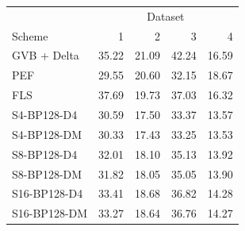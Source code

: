 \begin{tabular}{lrrrr}
\toprule
 & \multicolumn{4}{c}{Dataset} \\
Scheme & 1 & 2 & 3 & 4 \\
\midrule
GVB + Delta & 35.22 & 21.09 & 42.24 & 16.59 \\
PEF & 29.55 & 20.60 & 32.15 & 18.67 \\
FLS & 37.69 & 19.73 & 37.03 & 16.32 \\
S4-BP128-D4 & 30.59 & 17.50 & 33.37 & 13.57 \\
S4-BP128-DM & 30.33 & 17.43 & 33.25 & 13.53 \\
S8-BP128-D4 & 32.01 & 18.10 & 35.13 & 13.92 \\
S8-BP128-DM & 31.82 & 18.05 & 35.05 & 13.90 \\
S16-BP128-D4 & 33.41 & 18.68 & 36.82 & 14.28 \\
S16-BP128-DM & 33.27 & 18.64 & 36.76 & 14.27 \\
\bottomrule
\end{tabular}
